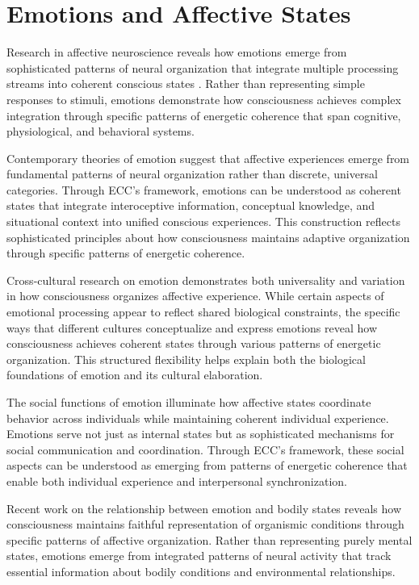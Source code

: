 \section{Emotions and Affective States}

Research in affective neuroscience reveals how emotions emerge from sophisticated patterns of neural organization that integrate multiple processing streams into coherent conscious states \cite{Panksepp1998, pinotsis2023cytoelectric}. Rather than representing simple responses to stimuli, emotions demonstrate how consciousness achieves complex integration through specific patterns of energetic coherence that span cognitive, physiological, and behavioral systems.

Contemporary theories of emotion \cite{barrett2017emotions, kukushkin2024massed} suggest that affective experiences emerge from fundamental patterns of neural organization rather than discrete, universal categories. Through ECC's framework, emotions can be understood as coherent states that integrate interoceptive information, conceptual knowledge, and situational context into unified conscious experiences. This construction reflects sophisticated principles about how consciousness maintains adaptive organization through specific patterns of energetic coherence.

Cross-cultural research on emotion \cite{Lutz1988, van2025processes} demonstrates both universality and variation in how consciousness organizes affective experience. While certain aspects of emotional processing appear to reflect shared biological constraints, the specific ways that different cultures conceptualize and express emotions reveal how consciousness achieves coherent states through various patterns of energetic organization. This structured flexibility helps explain both the biological foundations of emotion and its cultural elaboration.

The social functions of emotion \cite{Keltner2001, hunt2024electromagnetic} illuminate how affective states coordinate behavior across individuals while maintaining coherent individual experience. Emotions serve not just as internal states but as sophisticated mechanisms for social communication and coordination. Through ECC's framework, these social aspects can be understood as emerging from patterns of energetic coherence that enable both individual experience and interpersonal synchronization.

Recent work on the relationship between emotion and bodily states \cite{Damasio2018, bosl2025dynamical} reveals how consciousness maintains faithful representation of organismic conditions through specific patterns of affective organization. Rather than representing purely mental states, emotions emerge from integrated patterns of neural activity that track essential information about bodily conditions and environmental relationships.

